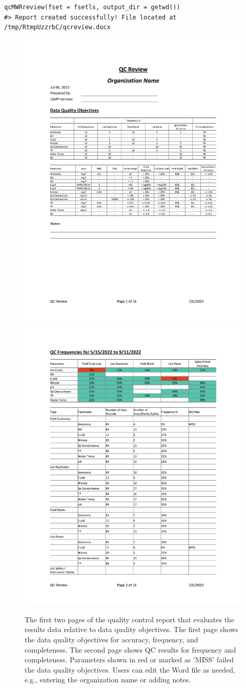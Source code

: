 \begin{verbatim}
qcMWRreview(fset = fsetls, output_dir = getwd())
#> Report created successfully! File located at /tmp/RtmpUzzrbC/qcreview.docx
\end{verbatim}

\begin{figure}
\includegraphics[width=0.5\linewidth]{figs/qcreview1} \includegraphics[width=0.5\linewidth]{figs/qcreview2} \caption{The first two pages of the quality control report that evaluates the results data relative to data quality objectives.  The first page shows the data quality objectives for accuracy, frequency, and completeness.  The second page shows QC results for frequency and completeness.  Parameters shown in red or marked as 'MISS' failed the data quality objectives.  Users can edit the Word file as needed, e.g., entering the organization name or adding notes.}\label{fig:qcex}
\end{figure}

